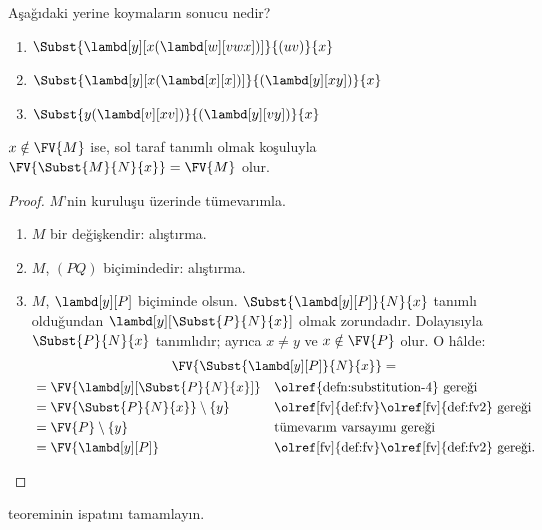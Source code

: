 \documentclass[../../../include/open-logic-section]{subfiles}
\begin{document}
\begin{prob}
  Aşağıdaki yerine koymaların sonucu nedir?
  \begin{enumerate}
  \item $\Subst{\lambd[y][x(\lambd[w][vwx])]}{(uv)}{x}$
  \item $\Subst{\lambd[y][x(\lambd[x][x])]}{(\lambd[y][xy])}{x}$
  \item $\Subst{y(\lambd[v][xv])}{(\lambd[y][vy])}{x}$
  \end{enumerate}
\end{prob}

\begin{thm} 
  $x \notin \FV{M}$ ise, sol taraf tanımlı olmak koşuluyla
  $\FV{\Subst{M}{N}{x}} = \FV{M}$ olur.
\end{thm}

\begin{proof}
  $M$'nin kuruluşu üzerinde tümevarımla.
  \begin{enumerate}
  \item $M$ bir değişkendir: alıştırma.
  \item $M$, $(PQ)$ biçimindedir: alıştırma.
  \item $M$, $\lambd[y][P]$ biçiminde olsun. 
    $\Subst{\lambd[y][P]}{N}{x}$ tanımlı olduğundan
    $\lambd[y][\Subst{P}{N}{x}]$ olmak zorundadır. Dolayısıyla
    $\Subst{P}{N}{x}$ tanımlıdır; ayrıca $x\neq y$ ve
    $x\notin\FV{P}$ olur. O hâlde:
    \begin{multline*}
      \FV{\Subst{\lambd[y][P]}{N}{x}} = \\
    \begin{aligned}
      & = \FV{\lambd[y][\Subst{P}{N}{x}]} &&
      \text{\olref{defn:substitution-4} gereği}\\
      & = \FV{\Subst{P}{N}{x}} \setminus \{y\} &&
      \text{\olref[fv]{def:fv}\olref[fv]{def:fv2} gereği}\\
      & = \FV{P} \setminus \{y\} && \text{tümevarım varsayımı gereği} \\
      & = \FV{\lambd[y][P]} &&
      \text{\olref[fv]{def:fv}\olref[fv]{def:fv2} gereği.}
    \end{aligned}
    \end{multline*}
  \end{enumerate}
\end{proof}

\begin{prob}
   teoreminin ispatını tamamlayın.
\end{prob}
\end{document}
